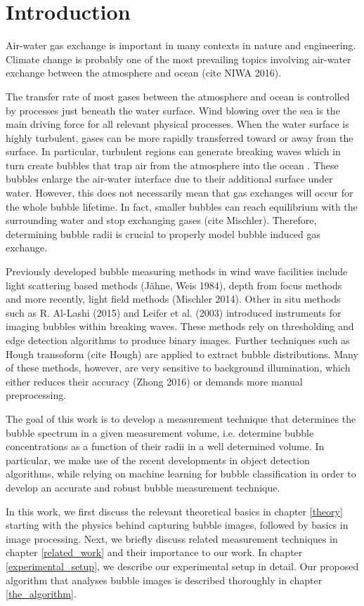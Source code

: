 \chapter{Introduction}
	Air-water gas exchange is important in many contexts in nature and engineering. Climate change is probably one of the most prevailing topics involving air-water exchange between the atmosphere and ocean (cite NIWA 2016). 
	
	The transfer rate of most gases between the atmosphere and ocean is controlled by processes just beneath the water surface. Wind blowing over the sea is the main driving force for all relevant physical processes. 
	When the water surface is highly turbulent, gases can be more rapidly transferred toward or away from the surface. In particular, turbulent regions can generate breaking waves which in turn create bubbles that trap air from the atmosphere into the ocean \citep{Terry}. These bubbles enlarge the air-water interface due to their additional surface under water. However, this does not necessarily mean that gas exchanges will occur for the whole bubble lifetime. In fact, smaller bubbles can reach equilibrium with the surrounding water and stop exchanging gases (cite Mischler). Therefore, determining bubble radii is crucial to properly model bubble induced gas exchange.
	
	Previously developed bubble measuring methods in wind wave facilities include light scattering based methods (Jähne, Weis 1984), depth from focus methods \citep{geissler_1995} and more recently, light field methods (Mischler 2014). Other in situ methods such as R. Al-Lashi (2015) and Leifer et al. (2003) introduced instruments for imaging bubbles within breaking waves. These methods rely on thresholding and edge detection algorithms to produce binary images. Further techniques such as Hough transoform (cite Hough) are applied to extract bubble distributions. Many of these methods, however, are very sensitive to background illumination, which either reduces their accuracy (Zhong 2016) or demands more manual preprocessing.  
	
	The goal of this work is to develop a measurement technique that determines the bubble spectrum in a given measurement volume, i.e. determine bubble concentrations as a function of their radii in a well determined volume. In particular, we make use of the recent developments in object detection algorithms, while relying on machine learning for bubble classification in order to develop an accurate and robust bubble measurement technique. 
	
	In this work, we first discuss the relevant theoretical basics in chapter \ref{theory} starting with the physics behind capturing bubble images, followed by basics in image processing. Next, we briefly discuss related measurement techniques in chapter \ref{related_work} and their importance to our work. In chapter \ref{experimental_setup}, we describe our experimental setup in detail. Our proposed algorithm that analyses bubble images is described thoroughly in chapter \ref{the_algorithm}. 